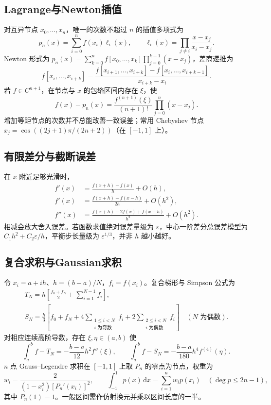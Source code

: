 \documentclass[../main.tex]{subfiles}
\begin{document}
\subsection{Lagrange与Newton插值}
对互异节点 $x_0,\ldots,x_n$，唯一的次数不超过 $n$ 的插值多项式为
\[
p_n(x)=\sum_{i=0}^nf(x_i)\ell_i(x),\qquad
\ell_i(x)=\prod_{j\ne i}\frac{x-x_j}{x_i-x_j}.
\]
Newton 形式为 $p_n(x)=\sum_{k=0}^nf[x_0,\ldots,x_k]\prod_{j=0}^{k-1}(x-x_j)$，差商递推为
\[
f[x_i,\ldots,x_{i+k}]=\frac{f[x_{i+1},\ldots,x_{i+k}]-f[x_i,\ldots,x_{i+k-1}]}{x_{i+k}-x_i}.
\]
若 $f\in C^{n+1}$，在节点与 $x$ 的包络区间内存在 $\xi$，使
\[
f(x)-p_n(x)=\frac{f^{(n+1)}(\xi)}{(n+1)!}\prod_{j=0}^n(x-x_j).
\]
增加等距节点的次数并不总能改善一致误差；常用 Chebyshev 节点 $x_j=\cos((2j+1)\pi/(2n+2))$（在 $[-1,1]$ 上）。
\subsection{有限差分与截断误差}
在 $x$ 附近足够光滑时，
\begin{align*}
f'(x)&=\frac{f(x+h)-f(x)}h+O(h),\\
f'(x)&=\frac{f(x+h)-f(x-h)}{2h}+O(h^2),\\
f''(x)&=\frac{f(x+h)-2f(x)+f(x-h)}{h^2}+O(h^2).
\end{align*}
相减会放大舍入误差。若函数求值绝对误差量级为 $\varepsilon$，中心一阶差分总误差模型为 $C_1h^2+C_2\varepsilon/h$，平衡步长量级为 $\varepsilon^{1/3}$，并非 $h$ 越小越好。
\subsection{复合求积与Gaussian求积}
令 $x_i=a+ih$、$h=(b-a)/N$，$f_i=f(x_i)$。复合梯形与 Simpson 公式为
\begin{gather*}
T_N=h\left[\frac{f_0+f_N}2+\sum_{i=1}^{N-1}f_i\right],\\
S_N=\frac h3\left[f_0+f_N+4\sum_{\substack{1\le i<N\\i\text{ 为奇数}}}f_i
+2\sum_{\substack{2\le i<N\\i\text{ 为偶数}}}f_i\right]\quad(N\text{ 为偶数}).
\end{gather*}
对相应连续高阶导数，存在 $\xi,\eta\in(a,b)$ 使
\[
\int_a^bf-T_N=-\frac{b-a}{12}h^2f''(\xi),\qquad
\int_a^bf-S_N=-\frac{b-a}{180}h^4f^{(4)}(\eta).
\]
$n$ 点 Gauss--Legendre 求积在 $[-1,1]$ 上取 $P_n$ 的零点为节点，权重为
\[
w_i=\frac2{(1-x_i^2)[P_n'(x_i)]^2},\qquad
\int_{-1}^1p(x)\,\mathrm dx=\sum_{i=1}^nw_ip(x_i)\quad(\deg p\le2n-1),
\]
其中 $P_n(1)=1$。一般区间需作仿射换元并乘以区间长度的一半。
\end{document}
